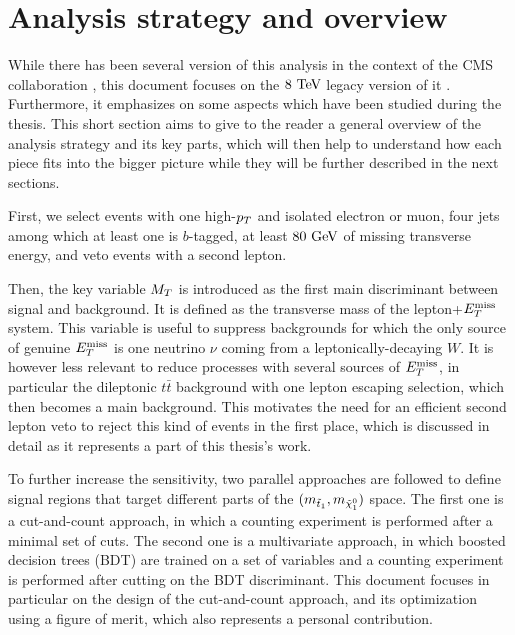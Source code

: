     \section{Analysis strategy and overview \label{sec:analysis_overview}}

    While there has been several version of this analysis in the context of the CMS
    collaboration \cite{SUS-12-023-PAS, SUS-13-011-PUB, SUS-14-015-PAS}, this document
    focuses on the $8~\text{TeV}$ legacy version of it \cite{SUS-14-015-PAS}. Furthermore,
    it emphasizes on some aspects which have been studied during the thesis.
    This short section aims to give to the reader a general overview of the analysis strategy
    and its key parts, which will then help to understand how each piece fits into the
    bigger picture while they will be further described in the next sections.

    First, we select events with one high-$p_T$ and isolated electron or muon, four jets
    among which at least one is $b$-tagged, at least $80~\text{GeV}$ of missing transverse energy,
    and veto events with a second lepton.

    Then, the key variable $M_T$ is introduced as the first main discriminant between signal
    and background. It is defined as the transverse mass of the lepton+$E_T^\text{miss}$ system. This
    variable is useful to suppress backgrounds for which the only source of genuine $E_T^\text{miss}$ is
    one neutrino $\nu$ coming from a leptonically-decaying $W$. It is however less relevant
    to reduce processes with several sources of $E_T^\text{miss}$, in particular the dileptonic $t\bar{t}$
    background with one lepton escaping selection, which then becomes a main background. This
    motivates the need for an efficient second lepton veto to reject this kind of events in the
    first place, which is discussed in detail as it represents a part of this thesis's work.

    To further increase the sensitivity, two parallel approaches are followed to define
    signal regions that target different parts of the $(m_{\tilde{t}_1},m_{\tilde{\chi}_1^0})$
    space. The first one is a cut-and-count approach, in which a counting experiment is performed
    after a minimal set of cuts. The second one is a multivariate approach, in which boosted
    decision trees (BDT) are trained on a set of variables and a counting experiment is performed
    after cutting on the BDT discriminant. This document focuses in particular on the design
    of the cut-and-count approach, and its optimization using a figure of merit, which
    also represents a personal contribution.

